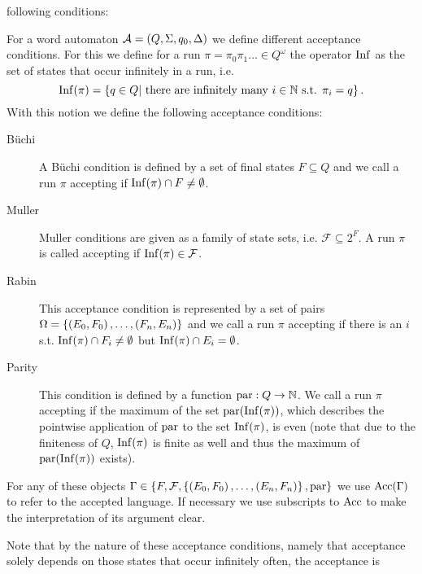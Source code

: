following conditions:
\begin{definition}
  For a word automaton $\mathcal{A} = \left(Q, \Sigma, q_{0}, \Delta\right)$ we
  define different acceptance conditions. For this we define for a run
  $\pi = \pi_{0}\pi_{1}\dots\in Q^{\omega}$ the operator
  $\operatorname{Inf}$ as the set of states that occur infinitely in a run, i.e.
  \begin{equation*}
    \operatorname{Inf}(\pi) = \left\{q\in Q\middle| \text{ there are infinitely many }
    i\in\mathbb{N} \text{ s.t. } \pi_{i} = q\right\}.
  \end{equation*}
  With this notion we define the following acceptance conditions:
  \begin{description}
    \item [Büchi] A Büchi condition is defined by a set of final states
      $F\subseteq Q$ and we call a run $\pi$ accepting if
      $\operatorname{Inf}(\pi)\cap F\neq\emptyset$.
    \item [Muller] Muller conditions are given as a family of state sets, i.e.
      $\mathcal{F}\subseteq 2^{F}$. A run $\pi$ is called accepting if
      $\operatorname{Inf}(\pi)\in\mathcal{F}$.
    \item [Rabin] This acceptance condition is represented by a set of pairs\\
      $\Omega = \left\{\left(E_{0}, F_{0}\right), \dots, \left(F_{n}, E_{n}\right)\right\}$ and we
      call a run $\pi$ accepting if there is an $i$ s.t.
      $\operatorname{Inf}(\pi)\cap F_{i}\neq\emptyset$ but $\operatorname{Inf}(\pi)\cap E_{i} = \emptyset$.
    \item [Parity] This condition is defined by a function
      $\operatorname{par}:Q\rightarrow \mathbb{N}$. We call a run $\pi$ accepting if the
      maximum of the set $\operatorname{par}(\operatorname{Inf}(\pi))$, which describes the pointwise
      application of $\operatorname{par}$ to the set $\operatorname{Inf}(\pi)$, is even (note that due
      to the finiteness of $Q$, $\operatorname{Inf}(\pi)$ is finite as well and thus the
      maximum of $\operatorname{par}(\operatorname{Inf}(\pi))$ exists).
  \end{description}
  For any of these objects $\Gamma\in\left\{F, \mathcal{F}, \left\{\left(E_{0},
  F_{0}\right),\dots,\left(E_{n}, F_{n}\right)\right\}, \operatorname{par}\right\}$ we use $\operatorname{Acc}(\Gamma)$ to refer
  to the accepted language. If necessary we use subscripts to $\operatorname{Acc}$ to make 
  the interpretation of its argument clear.
\end{definition}
Note that by the nature of these acceptance conditions, namely that acceptance
solely depends on those states that occur infinitely often, the acceptance is

